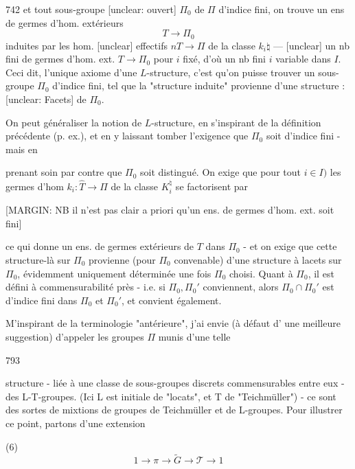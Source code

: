\newpage


742
et tout sous-groupe [unclear: ouvert] $\Pi_0$ de $\Pi$ d'indice
fini, on trouve un ens de germes
d'hom. extérieurs
$$T \longrightarrow \Pi_0$$
induites par les hom. [unclear] effectifs
$nT \longrightarrow \Pi$ de la classe $k_i \natural$ — [unclear]
un nb fini de germes d'hom. ext.
$T \longrightarrow \Pi_0$ pour $i$ fixé, d'où un nb fini
$i$ variable dans $I$. Ceci dit, l'unique
axiome d'une $L$-structure, c'est
qu'on puisse trouver un sous-
groupe $\Pi_0$ d'indice fini, tel que
la "structure induite" provienne
d'une structure : [unclear: Facets] de $\Pi_0$.

On peut généraliser la notion de
$L$-structure, en s'inspirant de la
définition précédente (p. ex.), et
en y laissant tomber l'exigence que
$\Pi_0$ soit d'indice fini - mais en

\newpage


prenant soin par contre que $\Pi_0$ soit
distingué. On exige que pour tout
$i \in I)$ les germes d'hom $k_i : \hat{T} \to \Pi$
de la classe $K_i^\natural$ se factorisent par

[MARGIN: NB il n'est pas clair a priori qu'un ens. de germes d'hom. ext. soit fini]

ce qui donne un ens. de
germes extérieurs de $T$ dans $\Pi_0$ -
et on exige que cette structure-là
sur $\Pi_0$ provienne (pour $\Pi_0$ convenable) d'une structure
à lacets sur $\Pi_0$, évidemment
uniquement déterminée une fois
$\Pi_0$ choisi. Quant à $\Pi_0$, il est
défini à commensurabilité près -
i.e. si $\Pi_0, \Pi_0'$ conviennent, alors
$\Pi_0 \cap \Pi_0'$ est d'indice fini dans $\Pi_0$ et
$\Pi_0'$, et convient également.

M'inspirant de la terminologie
"antérieure", j'ai envie (à défaut d'
une meilleure suggestion) d'appeler
les groupes $\Pi$ munis d'une telle

\newpage


793

structure - liée à une classe de
sous-groupes discrets commensurables
entre eux - des L-T-groupes.
(Ici L est initiale de "locats", et T
de "Teichmüller") - ce sont des
sortes de mixtions de groupes de
Teichmüller et de L-groupes. Pour
illustrer ce point, partons d'une
extension

(6) $$1 \to \pi \to \tilde{G} \to \mathcal{T} \to 1$$

